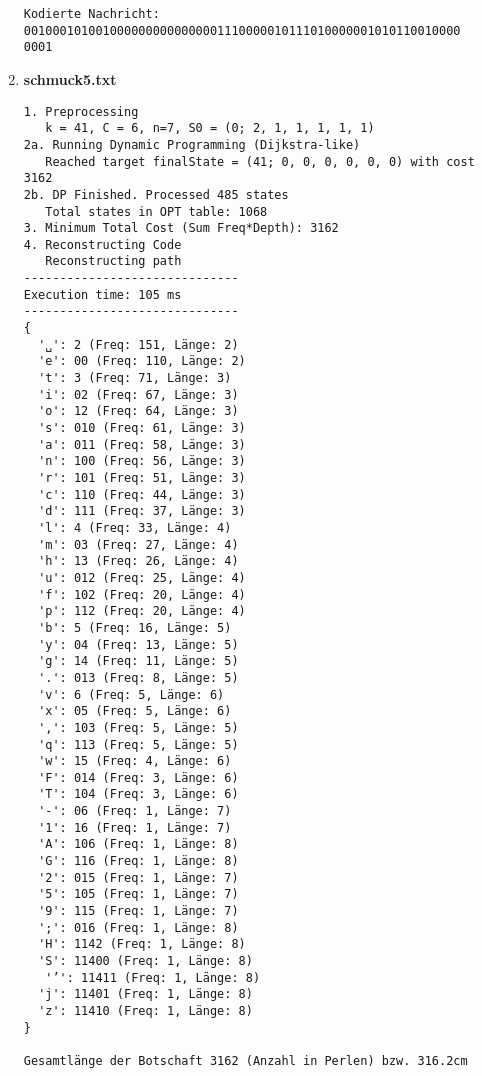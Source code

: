 \documentclass[a4paper,10pt,ngerman]{scrartcl}
\begin{document}
\begin{enumerate}
\begin{verbatim}
Kodierte Nachricht: 0010001010010000000000000001110000010111010000001010110010000
0001
  \end{verbatim}
  \item \textbf{schmuck5.txt}
  \begin{verbatim}
1. Preprocessing
   k = 41, C = 6, n=7, S0 = (0; 2, 1, 1, 1, 1, 1)
2a. Running Dynamic Programming (Dijkstra-like)
   Reached target finalState = (41; 0, 0, 0, 0, 0, 0) with cost 3162
2b. DP Finished. Processed 485 states
   Total states in OPT table: 1068
3. Minimum Total Cost (Sum Freq*Depth): 3162
4. Reconstructing Code
   Reconstructing path
------------------------------
Execution time: 105 ms
------------------------------
{
  '␣': 2 (Freq: 151, Länge: 2)
  'e': 00 (Freq: 110, Länge: 2)
  't': 3 (Freq: 71, Länge: 3)
  'i': 02 (Freq: 67, Länge: 3)
  'o': 12 (Freq: 64, Länge: 3)
  's': 010 (Freq: 61, Länge: 3)
  'a': 011 (Freq: 58, Länge: 3)
  'n': 100 (Freq: 56, Länge: 3)
  'r': 101 (Freq: 51, Länge: 3)
  'c': 110 (Freq: 44, Länge: 3)
  'd': 111 (Freq: 37, Länge: 3)
  'l': 4 (Freq: 33, Länge: 4)
  'm': 03 (Freq: 27, Länge: 4)
  'h': 13 (Freq: 26, Länge: 4)
  'u': 012 (Freq: 25, Länge: 4)
  'f': 102 (Freq: 20, Länge: 4)
  'p': 112 (Freq: 20, Länge: 4)
  'b': 5 (Freq: 16, Länge: 5)
  'y': 04 (Freq: 13, Länge: 5)
  'g': 14 (Freq: 11, Länge: 5)
  '.': 013 (Freq: 8, Länge: 5)
  'v': 6 (Freq: 5, Länge: 6)
  'x': 05 (Freq: 5, Länge: 6)
  ',': 103 (Freq: 5, Länge: 5)
  'q': 113 (Freq: 5, Länge: 5)
  'w': 15 (Freq: 4, Länge: 6)
  'F': 014 (Freq: 3, Länge: 6)
  'T': 104 (Freq: 3, Länge: 6)
  '-': 06 (Freq: 1, Länge: 7)
  '1': 16 (Freq: 1, Länge: 7)
  'A': 106 (Freq: 1, Länge: 8)
  'G': 116 (Freq: 1, Länge: 8)
  '2': 015 (Freq: 1, Länge: 7)
  '5': 105 (Freq: 1, Länge: 7)
  '9': 115 (Freq: 1, Länge: 7)
  ';': 016 (Freq: 1, Länge: 8)
  'H': 1142 (Freq: 1, Länge: 8)
  'S': 11400 (Freq: 1, Länge: 8)
   '’': 11411 (Freq: 1, Länge: 8)
  'j': 11401 (Freq: 1, Länge: 8)
  'z': 11410 (Freq: 1, Länge: 8)
}

Gesamtlänge der Botschaft 3162 (Anzahl in Perlen) bzw. 316.2cm


\end{verbatim}
\end{enumerate}
\end{document}
